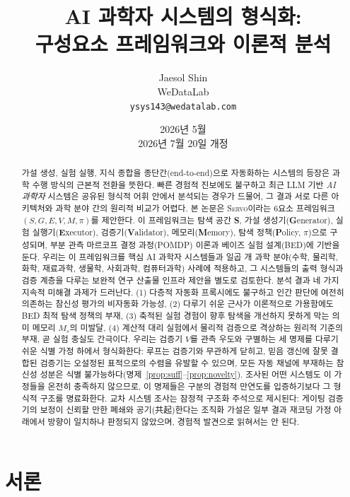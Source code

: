 \documentclass[11pt]{article}
\title{\textbf{AI 과학자 시스템의 형식화:\\
구성요소 프레임워크와 이론적 분석}}
\author{
  Jaesol Shin\\
  \small{WeDataLab}\\
  \texttt{ysys143@wedatalab.com}
}
\date{2026년 5월\\\small 2026년 7월 20일 개정}
\newcommand{\sgmvpi}{$(S, G, E, V, M, \pi)$}
\newcommand{\framework}{\textsc{Servo}}
\begin{document}
\maketitle

\begin{abstract}
가설 생성, 실험 실행, 지식 종합을 종단간(end-to-end)으로 자동화하는 시스템의 등장은 과학 수행 방식의 근본적 전환을 뜻한다. 빠른 경험적 진보에도 불구하고 최근 LLM 기반 \emph{AI 과학자} 시스템은 공유된 형식적 어휘 안에서 분석되는 경우가 드물어, 그 결과 서로 다른 아키텍처와 과학 분야 간의 원리적 비교가 어렵다. 본 논문은 \framework{}이라는 6요소 프레임워크 \sgmvpi{}를 제안한다. 이 프레임워크는 탐색 공간 \textbf{S}, 가설 생성기(\textbf{G}enerator), 실험 실행기(\textbf{E}xecutor), 검증기(\textbf{V}alidator), 메모리(\textbf{M}emory), 탐색 정책(\textbf{P}olicy, $\pi$)으로 구성되며, 부분 관측 마르코프 결정 과정(POMDP) 이론과 베이즈 실험 설계(BED)에 기반을 둔다. 우리는 이 프레임워크를 핵심 AI 과학자 시스템들과 일곱 개 과학 분야(수학, 물리학, 화학, 재료과학, 생물학, 사회과학, 컴퓨터과학) 사례에 적용하고, 그 시스템들의 출력 형식과 검증 계층을 다루는 보완적 연구 산출물 인프라 제안을 별도로 검토한다. 분석 결과 네 가지 지속적 미해결 과제가 드러난다. (1) 다층적 자동화 프록시에도 불구하고 인간 판단에 여전히 의존하는 참신성 평가의 비자동화 가능성, (2) 다루기 쉬운 근사가 이론적으로 가용함에도 BED 최적 탐색 정책의 부재, (3) 축적된 실험 경험이 향후 탐색을 개선하지 못하게 막는 의미 메모리 $M_s$의 미발달, (4) 계산적 대리 실험에서 물리적 검증으로 격상하는 원리적 기준의 부재, 곧 실험 충실도 간극이다. 우리는 검증기 $V$를 관측 우도와 구별하는 세 명제를 다루기 쉬운 식별 가정 하에서 형식화한다: 루프는 검증기와 무관하게 닫히고, 믿음 갱신에 잘못 결합된 검증기는 오설정된 표적으로의 수렴을 유발할 수 있으며, 모든 자동 채널에 부재하는 참신성 성분은 식별 불가능하다(명제~\ref{prop:suff}--\ref{prop:novelty}). 조사된 어떤 시스템도 이 가정들을 온전히 충족하지 않으므로, 이 명제들은 구분의 경험적 만연도를 입증하기보다 그 형식적 구조를 명료화한다. 교차 시스템 조사는 잠정적 구조화 주석으로 제시된다: 게이팅 검증기의 보정이 신뢰할 만한 폐쇄와 공기(共起)한다는 조직화 가설은 일부 결과 재코딩 가정 아래에서 방향이 일치하나 판정되지 않았으며, 경험적 발견으로 읽혀서는 안 된다.
\end{abstract}

\section{서론}
\end{document}
